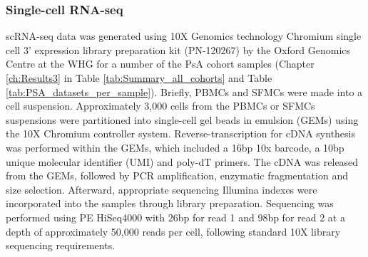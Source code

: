 \subsubsection{Single-cell RNA-seq} 
\label{scRNA_processing}
scRNA-seq data was generated using 10X Genomics technology Chromium single cell 3' expression library preparation kit (PN-120267) by the Oxford Genomics Centre at the WHG for a number of the PsA cohort samples (Chapter \ref{ch:Results3} in Table \ref{tab:Summary_all_cohorts} and Table \ref{tab:PSA_datasets_per_sample}). Briefly, PBMCs and SFMCs were made into a cell suspension. Approximately 3,000 cells from the PBMCs or SFMCs suspensions were partitioned into single-cell gel beads in emulsion (GEMs) using the 10X Chromium controller system. Reverse-transcription for cDNA synthesis was performed within the GEMs, which included a 16bp 10x barcode, a 10bp unique molecular identifier (UMI) and poly-dT primers. The cDNA was released from the GEMs, followed by PCR amplification, enzymatic fragmentation and size selection. Afterward, appropriate sequencing Illumina indexes were incorporated into the samples through library preparation. Sequencing was performed using PE HiSeq4000 with 26bp for read 1 and 98bp for read 2 at a depth of approximately 50,000 reads per cell, following standard 10X library sequencing requirements. 





